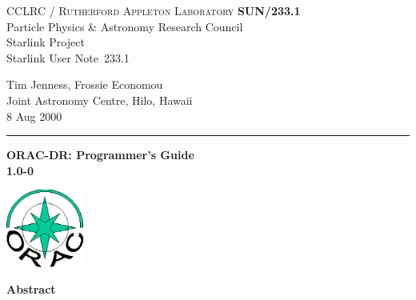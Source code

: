 \documentclass[twoside,11pt]{article}
\newcommand{\stardoccategory}  {Starlink User Note}
\newcommand{\stardocinitials}  {SUN}
\newcommand{\stardocnumber}    {233.1}
\newcommand{\stardocauthors}   {Tim Jenness, Frossie Economou\\
Joint Astronomy Centre, Hilo, Hawaii}
\newcommand{\stardocdate}      {8 Aug 2000}
\newcommand{\stardoctitle}     {ORAC-DR: Programmer's Guide}
\newcommand{\stardocversion}   {1.0-0}
\newcommand{\stardocmanual}    {}
\newcommand{\stardocname}{\stardocinitials /\stardocnumber}
\newenvironment{latexonly}{}{}
\renewcommand{\_}{\texttt{\symbol{95}}}
\begin{document}
\thispagestyle{empty}

\begin{latexonly}
   CCLRC / \textsc{Rutherford Appleton Laboratory} \hfill \textbf{\stardocname}\\
   {\large Particle Physics \& Astronomy Research Council}\\
   {\large Starlink Project\\}
   {\large \stardoccategory\ \stardocnumber}
   \begin{flushright}
   \stardocauthors\\
   \stardocdate
   \end{flushright}
   \vspace{-4mm}
   \rule{\textwidth}{0.5mm}
   \vspace{5mm}
   \begin{center}
   {\Huge\textbf{\stardoctitle \\ [2.5ex]}}
   {\LARGE\textbf{\stardocversion \\ [4ex]}}
   {\Huge\textbf{\stardocmanual}}
   \end{center}
   \vspace{5mm}

\begin{center}
\includegraphics[width=1.0in]{sun233_logo.eps}
\end{center}

   \vspace{10mm}
   \begin{center}
      {\Large\textbf{Abstract}}
   \end{center}
\end{latexonly}
\end{document}
